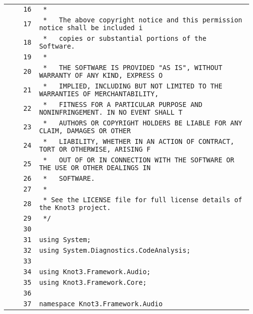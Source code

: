\documentclass[a4paper,10pt]{article}
\begin{document}
\begin{longtable}[l]{lrrl}
\cellcolor{gray} &  & \verb~16~ & \verb~ *~\\
\cellcolor{gray} &  & \verb~17~ & \verb~ *   The above copyright notice and this permission notice shall be included i~\\
\cellcolor{gray} &  & \verb~18~ & \verb~ *   copies or substantial portions of the Software.~\\
\cellcolor{gray} &  & \verb~19~ & \verb~ *~\\
\cellcolor{gray} &  & \verb~20~ & \verb~ *   THE SOFTWARE IS PROVIDED "AS IS", WITHOUT WARRANTY OF ANY KIND, EXPRESS O~\\
\cellcolor{gray} &  & \verb~21~ & \verb~ *   IMPLIED, INCLUDING BUT NOT LIMITED TO THE WARRANTIES OF MERCHANTABILITY,~\\
\cellcolor{gray} &  & \verb~22~ & \verb~ *   FITNESS FOR A PARTICULAR PURPOSE AND NONINFRINGEMENT. IN NO EVENT SHALL T~\\
\cellcolor{gray} &  & \verb~23~ & \verb~ *   AUTHORS OR COPYRIGHT HOLDERS BE LIABLE FOR ANY CLAIM, DAMAGES OR OTHER~\\
\cellcolor{gray} &  & \verb~24~ & \verb~ *   LIABILITY, WHETHER IN AN ACTION OF CONTRACT, TORT OR OTHERWISE, ARISING F~\\
\cellcolor{gray} &  & \verb~25~ & \verb~ *   OUT OF OR IN CONNECTION WITH THE SOFTWARE OR THE USE OR OTHER DEALINGS IN~\\
\cellcolor{gray} &  & \verb~26~ & \verb~ *   SOFTWARE.~\\
\cellcolor{gray} &  & \verb~27~ & \verb~ *~\\
\cellcolor{gray} &  & \verb~28~ & \verb~ * See the LICENSE file for full license details of the Knot3 project.~\\
\cellcolor{gray} &  & \verb~29~ & \verb~ */~\\
\cellcolor{gray} &  & \verb~30~ & \verb~~\\
\cellcolor{gray} &  & \verb~31~ & \verb~using System;~\\
\cellcolor{gray} &  & \verb~32~ & \verb~using System.Diagnostics.CodeAnalysis;~\\
\cellcolor{gray} &  & \verb~33~ & \verb~~\\
\cellcolor{gray} &  & \verb~34~ & \verb~using Knot3.Framework.Audio;~\\
\cellcolor{gray} &  & \verb~35~ & \verb~using Knot3.Framework.Core;~\\
\cellcolor{gray} &  & \verb~36~ & \verb~~\\
\cellcolor{gray} &  & \verb~37~ & \verb~namespace Knot3.Framework.Audio~\\

\end{longtable}
\end{document}
